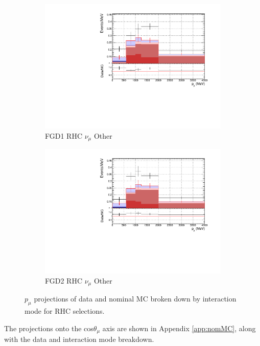 \begin{figure}[!htbp]
\begin{subfigure}{0.49\textwidth}
  \centering
  \includegraphics[width=\textwidth]{figs/FGD1_NuMuBkg_CCOther_in_AntiNu_Mode_p}
  \caption{FGD1 RHC $\nu_{\mu}$ Other}
\end{subfigure}
\begin{subfigure}{0.49\textwidth}
  \centering
  \includegraphics[width=\textwidth]{figs/FGD2_NuMuBkg_CCOther_in_AntiNu_Mode_p}
  \caption{FGD2 RHC $\nu_{\mu}$ Other}
\end{subfigure}
\caption{$p_{\mu}$ projections of data and nominal MC broken down by interaction mode for RHC \numu selections.}
\label{fig:pstack_rhc_numu}
\end{figure}

The projections onto the cos$\theta_{\mu}$ axis are shown in Appendix \ref{app:nomMC}, along with the data and interaction mode breakdown.


